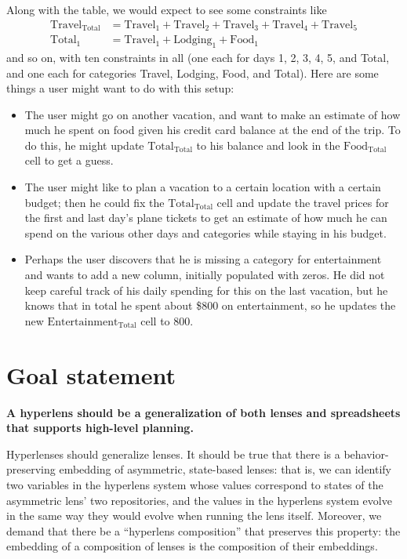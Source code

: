 Along with the table, we would expect to see some constraints like
\begin{align*}
    \mathrm{Travel}_\mathrm{Total} &=
    \mathrm{Travel}_1+\mathrm{Travel}_2+\mathrm{Travel}_3+\mathrm{Travel}_4+\mathrm{Travel}_5
    \\
    \mathrm{Total}_1 &= \mathrm{Travel_1}+\mathrm{Lodging}_1+\mathrm{Food}_1
\end{align*}
and so on, with ten constraints in all (one each for days 1, 2, 3, 4, 5, and
Total, and one each for categories Travel, Lodging, Food, and Total). Here
are some things a user might want to do with this setup:
\begin{itemize}
    \item The user might go on another vacation, and want to make an
        estimate of how much he spent on food given his credit card balance
        at the end of the trip. To do this, he might update
        $\mathrm{Total}_\mathrm{Total}$ to his balance and look in the
        $\mathrm{Food}_\mathrm{Total}$ cell to get a guess.
    \item The user might like to plan a vacation to a certain
        location with a certain budget; then he could fix the
        $\mathrm{Total}_\mathrm{Total}$ cell and update the travel prices
        for the first and last day's plane tickets to get an estimate of how
        much he can spend on the various other days and categories while
        staying in his budget.
    \item Perhaps the user discovers that he is missing a category for
        entertainment and wants to add a new column, initially populated
        with zeros. He did not keep careful track of his daily spending for
        this on the last vacation, but he knows that in total he spent about
        \$800 on entertainment, so he updates the new
        $\mathrm{Entertainment}_\mathrm{Total}$ cell to 800.
\end{itemize}

\section{Goal statement}
{\bf A hyperlens should be a generalization of both lenses and spreadsheets that
supports high-level planning.}

Hyperlenses should generalize lenses. It should be true that there is a
behavior-preserving embedding of asymmetric, state-based lenses: that is, we
can identify two variables in the hyperlens system whose values correspond
to states of the asymmetric lens' two repositories, and the values in the
hyperlens system evolve in the same way they would evolve when running the
lens itself. Moreover, we demand that there be a ``hyperlens composition''
that preserves this property: the embedding of a composition of lenses is
the composition of their embeddings.

